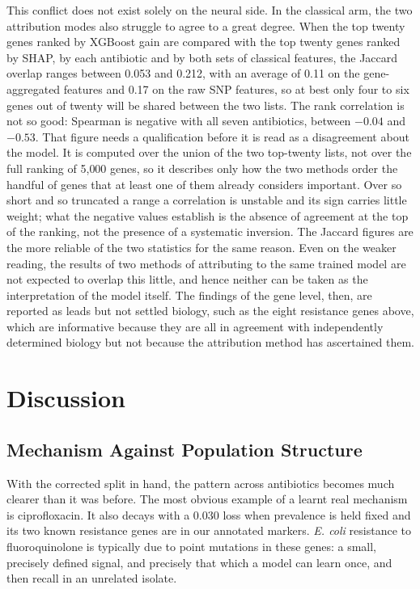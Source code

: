 \documentclass[journal]{IEEEtran}
\begin{document}
This conflict does not exist solely on the neural side. In the classical arm, the two
attribution modes also struggle to agree to a great degree. When the top twenty genes
ranked by XGBoost gain are compared with the top twenty genes ranked by SHAP, by each
antibiotic and by both sets of classical features, the Jaccard overlap ranges between
0.053 and 0.212, with an average of 0.11 on the gene-aggregated features and 0.17 on
the raw SNP features, so at best only four to six genes out of twenty will be shared
between the two lists. The rank correlation is not so good: Spearman is negative with
all seven antibiotics, between $-0.04$ and $-0.53$. That figure needs a qualification
before it is read as a disagreement about the model. It is computed over the union of
the two top-twenty lists, not over the full ranking of 5{,}000 genes, so it describes
only how the two methods order the handful of genes that at least one of them already
considers important. Over so short and so truncated a range a correlation is unstable
and its sign carries little weight; what the negative values establish is the absence
of agreement at the top of the ranking, not the presence of a systematic inversion. The
Jaccard figures are the more reliable of the two statistics for the same reason. Even
on the weaker reading, the results of two methods of attributing to the same trained
model are not expected to overlap this little, and hence neither can be taken as the
interpretation of the model itself. The findings of the
gene level, then, are reported as leads but not settled biology, such as the eight
resistance genes above, which are informative because they are all in agreement with
independently determined biology but not because the attribution method has ascertained
them.

\section{Discussion}
\label{sec:discussion}

\subsection{Mechanism Against Population Structure}

With the corrected split in hand, the pattern across antibiotics becomes much clearer
than it was before. The most obvious example of a learnt real mechanism is
ciprofloxacin. It also decays with a 0.030 loss when prevalence is held fixed and its
two known resistance genes are in our annotated markers. \textit{E. coli} resistance
to fluoroquinolone is typically due to point mutations in these genes: a small,
precisely defined signal, and precisely that which a model can learn once, and then
recall in an unrelated isolate.
\end{document}
